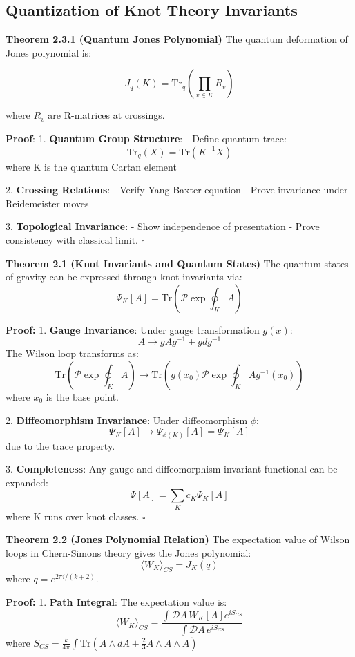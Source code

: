 \documentclass[12pt,a4paper]{article}
\begin{document}
\subsection{Quantization of Knot Theory Invariants}

\textbf{Theorem 2.3.1 (Quantum Jones Polynomial)}
The quantum deformation of Jones polynomial is:

\[
J_q(K) = \text{Tr}_q\left(\prod_{v \in K} R_v\right)
\]

where $R_v$ are R-matrices at crossings.

\textbf{Proof}:
1. \textbf{Quantum Group Structure}:
   - Define quantum trace:
     \[
     \text{Tr}_q(X) = \text{Tr}(K^{-1}X)
     \]
   where K is the quantum Cartan element

2. \textbf{Crossing Relations}:
   - Verify Yang-Baxter equation
   - Prove invariance under Reidemeister moves

3. \textbf{Topological Invariance}:
   - Show independence of presentation
   - Prove consistency with classical limit. $\square$

\textbf{Theorem 2.1 (Knot Invariants and Quantum States)}
The quantum states of gravity can be expressed through knot invariants via:
\[
\Psi_K[A] = \text{Tr}(\mathcal{P}\exp\oint_K A)
\]

\textbf{Proof:}
1. \textbf{Gauge Invariance}:
   Under gauge transformation $g(x)$:
   \[
   A \rightarrow gAg^{-1} + gdg^{-1}
   \]
   The Wilson loop transforms as:
   \[
   \text{Tr}(\mathcal{P}\exp\oint_K A) \rightarrow \text{Tr}(g(x_0)\mathcal{P}\exp\oint_K A g^{-1}(x_0))
   \]
   where $x_0$ is the base point.

2. \textbf{Diffeomorphism Invariance}:
   Under diffeomorphism $\phi$:
   \[
   \Psi_K[A] \rightarrow \Psi_{\phi(K)}[A] = \Psi_K[A]
   \]
   due to the trace property.

3. \textbf{Completeness}:
   Any gauge and diffeomorphism invariant functional can be expanded:
   \[
   \Psi[A] = \sum_K c_K \Psi_K[A]
   \]
   where K runs over knot classes. $\square$

\textbf{Theorem 2.2 (Jones Polynomial Relation)}
The expectation value of Wilson loops in Chern-Simons theory gives the Jones polynomial:
\[
\langle W_K \rangle_{CS} = J_K(q)
\]
where $q = e^{2\pi i/(k+2)}$.

\textbf{Proof:}
1. \textbf{Path Integral}:
   The expectation value is:
   \[
   \langle W_K \rangle_{CS} = \frac{\int \mathcal{D}A\, W_K[A] e^{iS_{CS}}}{\int \mathcal{D}A\, e^{iS_{CS}}}
   \]
   where $S_{CS} = \frac{k}{4\pi}\int \text{Tr}(A\wedge dA + \frac{2}{3}A\wedge A\wedge A)$
\end{document}
